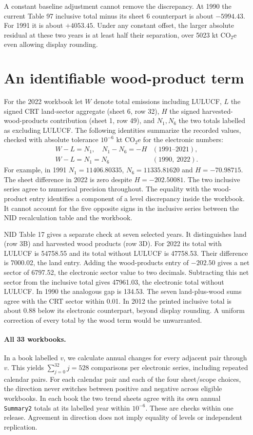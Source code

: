 \documentclass[11pt]{article}
\begin{document}
A constant baseline adjustment cannot remove the discrepancy. At 1990 the current Table 97 inclusive total minus its sheet 6 counterpart is about $-5994.43$. For 1991 it is about $+4053.45$. Under any constant offset, the larger absolute residual at these two years is at least half their separation, over 5023 kt CO$_2$e even allowing display rounding.

\newpage
\section{An identifiable wood-product term}
For the 2022 workbook let $W$ denote total emissions including LULUCF, $L$ the signed CRT land-sector aggregate (sheet 6, row 32), $H$ the signed harvested-wood-products contribution (sheet 1, row 49), and $N_1,N_6$ the two totals labelled as excluding LULUCF. The following identities summarize the recorded values, checked with absolute tolerance $10^{-6}$ kt CO$_2$e for the electronic numbers:
\[
\begin{array}{ll}
W-L=N_1,\quad N_1-N_6=-H & (1991\text{--}2021),\\
W-L=N_1=N_6 & (1990,\ 2022).
\end{array}
\]
For example, in 1991 $N_1=11406.80335$, $N_6=11335.81620$ and $H=-70.98715$. The sheet difference in 2022 is zero despite $H=-202.50081$. The two inclusive series agree to numerical precision throughout. The equality with the wood-product entry identifies a component of a level discrepancy inside the workbook. It cannot account for the five opposite signs in the inclusive series between the NID recalculation table and the workbook.

NID Table 17 gives a separate check at seven selected years. It distinguishes land (row 3B) and harvested wood products (row 3D). For 2022 its total with LULUCF is 54758.55 and its total without LULUCF is 47758.53. Their difference is 7000.02, the land entry. Adding the wood-products entry of $-202.50$ gives a net sector of 6797.52, the electronic sector value to two decimals. Subtracting this net sector from the inclusive total gives 47961.03, the electronic total without LULUCF. In 1990 the analogous gap is 134.53. The seven land-plus-wood sums agree with the CRT sector within 0.01. In 2012 the printed inclusive total is about 0.88 below its electronic counterpart, beyond display rounding. A uniform correction of every total by the wood term would be unwarranted.

\paragraph{All 33 workbooks.} In a book labelled $v$, we calculate annual changes for every adjacent pair through $v$. This yields $\sum_{j=0}^{32}j=528$ comparisons per electronic series, including repeated calendar pairs. For each calendar pair and each of the four sheet/scope choices, the direction never switches between positive and negative across eligible workbooks. In each book the two trend sheets agree with its own annual \texttt{Summary2} totals at its labelled year within $10^{-6}$. These are checks within one release. Agreement in direction does not imply equality of levels or independent replication.
\end{document}
